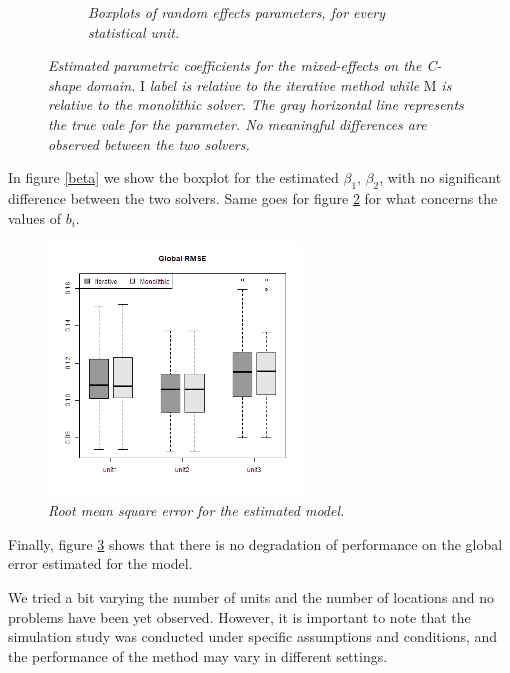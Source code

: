 \begin{figure}
\begin{subfigure}{0.45\textwidth}
		\centering
		\caption{\textit{Boxplots of random effects parameters, for every statistical unit.}}
		\label{b}
	\end{subfigure}
	\caption{\textit{Estimated parametric coefficients for the
			mixed-effects on the C-shape domain.} I \textit{label is relative to the
			iterative method while} M \textit{is relative to the monolithic solver. The
			gray horizontal line represents the true vale for the parameter. No meaningful
			differences are observed between the two solvers. }}
\end{figure}

In figure \ref{beta} we show the boxplot for the estimated $\beta_1$,
$\beta_2$, with no significant difference between the two solvers. Same goes
for figure \ref{b} for what concerns the values of $b_i$.

\begin{figure}[t]
	\includegraphics[width=0.6\textwidth]{images/rmse.png}
	\centering
	\caption{\textit{Root mean square error for the estimated model.}}
	\label{rmse}
\end{figure}
Finally, figure \ref{rmse} shows that there is no degradation of
performance on the global error estimated for the model.

We tried a bit varying the number of units and the number of locations and no
problems have been yet observed. However, it is important to note that the
simulation study was conducted under specific assumptions and conditions, and
the performance of the method may vary in different settings.

